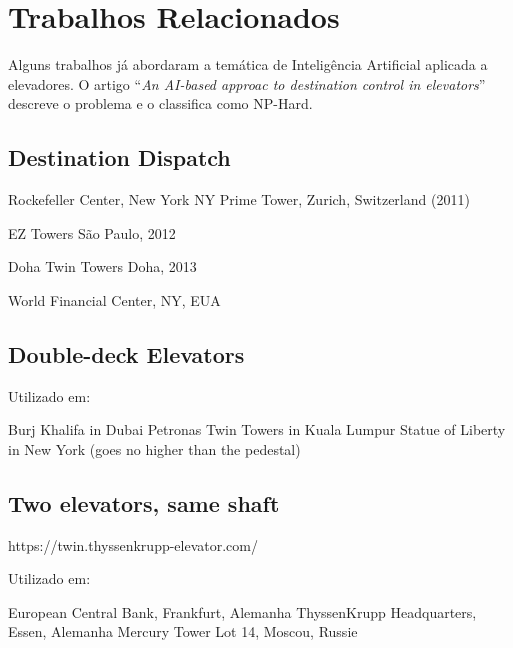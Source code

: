 \chapter{\label{chap:related}Trabalhos Relacionados}

Alguns trabalhos já abordaram a temática de Inteligência Artificial aplicada a
elevadores. O artigo ``\textit{An AI-based approac to destination control in
  elevators}''~\cite{KOEHLEROTTIGER02} descreve o problema e o classifica como
NP-Hard.  %




\section{Destination Dispatch}


Rockefeller Center, New York NY
Prime Tower, Zurich, Switzerland (2011)


EZ Towers
São Paulo, 2012

Doha Twin Towers
Doha, 2013


World Financial Center, NY, EUA

\section{Double-deck Elevators}


Utilizado em:

Burj Khalifa in Dubai
Petronas Twin Towers in Kuala Lumpur
Statue of Liberty in New York (goes no higher than the pedestal)

\section{Two elevators, same shaft}

https://twin.thyssenkrupp-elevator.com/

Utilizado em:

European Central Bank, Frankfurt, Alemanha
ThyssenKrupp Headquarters, Essen, Alemanha
Mercury Tower Lot 14, Moscou, Russie